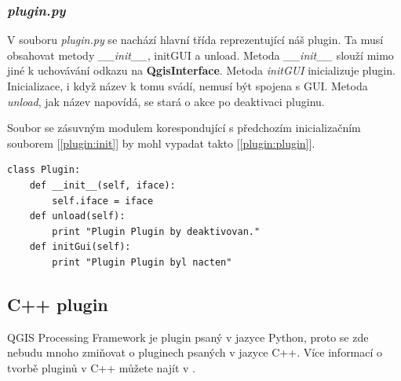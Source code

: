 \subsubsection*{\textit{plugin.py}}
V souboru \textit{plugin.py} se nachází hlavní třída reprezentující náš plugin. Ta musí obsahovat metody \textit{\_\_init\_\_}, initGUI a unload. Metoda \textit{\_\_init\_\_} slouží mimo jiné k uchovávání odkazu na \textbf{QgisInterface}. Metoda \textit{initGUI} inicializuje plugin. Inicializace, i když název k tomu svádí, nemusí být spojena s GUI. Metoda \textit{unload}, jak název napovídá, se stará o akce po deaktivaci pluginu. 

\newpage
Soubor se zásuvným modulem korespondující s předchozím inicializačním souborem [\autoref{plugin:init}] by mohl vypadat takto [\autoref{plugin:plugin}]. \\

\begin{lstlisting}[caption={plugin.py - plugin},label=plugin:plugin]
class Plugin:
    def __init__(self, iface):
        self.iface = iface
    def unload(self):
        print "Plugin Plugin by deaktivovan."
    def initGui(self):
		print "Plugin Plugin byl nacten"
\end{lstlisting}

\subsection{C++ plugin}
QGIS Processing Framework je plugin psaný v jazyce Python, proto se zde nebudu mnoho zmiňovat o pluginech psaných v jazyce C++. Více informací o tvorbě pluginů v C++ můžete najít v  .
% 




